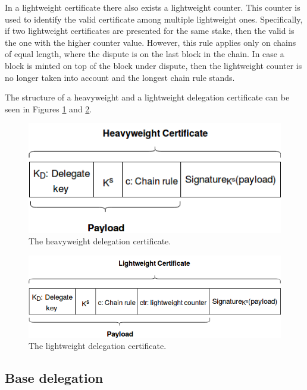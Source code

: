 In a lightweight certificate there also exists a lightweight counter. This counter is used to identify the valid certificate among multiple lightweight ones. Specifically, if two lightweight certificates are presented for the same stake, then the valid is the one with the higher counter value. However, this rule applies only on chains of equal length, where the dispute is on the last block in the chain. In case a block is minted on top of the block under dispute, then the lightweight counter is no longer taken into account and the longest chain rule stands.

The structure of a heavyweight and a lightweight delegation certificate can be seen in Figures \ref{fig:certificate_v2} and \ref{fig:light_certificate_v2}.

\begin{figure}
  \begin{center}
    \includegraphics[width=340pt]{figures/certificate_v2.png}
  \end{center}
  \caption{The heavyweight delegation certificate.}
  \label{fig:certificate_v2}
\end{figure}

\begin{figure}
  \begin{center}
    \includegraphics[width=340pt]{figures/light_certificate_v2.png}
  \end{center}
  \caption{The lightweight delegation certificate.}
  \label{fig:light_certificate_v2}
\end{figure}

\subsection{Base delegation}

